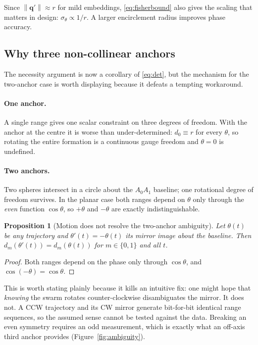 \documentclass[11pt,a4paper]{article}
\newtheorem{proposition}{Proposition}
\newcommand{\q}{\bm{q}}
\newcommand{\norm}[1]{\left\lVert#1\right\rVert}
\begin{document}
Since $\norm{\q'}\approx r$ for mild embeddings, \eqref{eq:fisherbound} also
gives the scaling that matters in design: $\sigma_\theta \propto 1/r$. A larger
encirclement radius improves phase accuracy.

\subsection{Why three non-collinear anchors}
\label{sec:whythree}

The necessity argument is now a corollary of \eqref{eq:det}, but the mechanism
for the two-anchor case is worth displaying because it defeats a tempting
workaround.

\paragraph{One anchor.} A single range gives one scalar constraint on three
degrees of freedom. With the anchor at the centre it is worse than
under-determined: $d_0\equiv r$ for every $\theta$, so rotating the entire
formation is a continuous gauge freedom and $\theta=0$ is undefined.

\paragraph{Two anchors.} Two spheres intersect in a circle about the
$A_0A_1$ baseline; one rotational degree of freedom survives. In the planar case
both ranges depend on $\theta$ only through the \emph{even} function
$\cos\theta$, so $+\theta$ and $-\theta$ are exactly indistinguishable.

\begin{proposition}[Motion does not resolve the two-anchor ambiguity]
\label{prop:mirror}
Let $\theta(t)$ be any trajectory and $\theta'(t)=-\theta(t)$ its mirror image
about the baseline. Then $d_m(\theta'(t)) = d_m(\theta(t))$ for $m\in\{0,1\}$
and all $t$.
\end{proposition}
\begin{proof}
Both ranges depend on the phase only through $\cos\theta$, and
$\cos(-\theta)=\cos\theta$.
\end{proof}

This is worth stating plainly because it kills an intuitive fix: one might hope
that \emph{knowing} the swarm rotates counter-clockwise disambiguates the
mirror. It does not. A CCW trajectory and its CW mirror generate bit-for-bit
identical range sequences, so the assumed sense cannot be tested against the
data. Breaking an even symmetry requires an odd measurement, which is exactly
what an off-axis third anchor provides (Figure~\ref{fig:ambiguity}).
\end{document}
